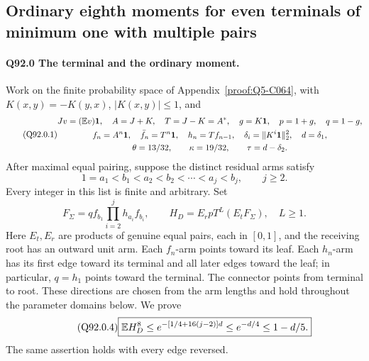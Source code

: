 \subsection{Ordinary eighth moments for even terminals of minimum one with multiple pairs}\label{proof:Q5-C092}

\paragraph{Q92.0 The terminal and the ordinary moment.}
Work on the finite probability space of Appendix~\ref{proof:Q5-C064}, with
\(K(x,\allowbreak y)=\allowbreak -K(y,\allowbreak x)\), \(|K(x,\allowbreak y)|\le\allowbreak 1\), and
\begin{equation}\tag{Q92.0.1}\label{eq:Q92:0.1}
\begin{gathered}
Jv=(\mathbb E v)\mathbf1,\quad A=J+K,\quad T=J-K=A^*,\quad
g=K\mathbf1,\quad p=1+g,\quad q=1-g,\\
f_n=A^n\mathbf1,\quad\bar f_n=T^n\mathbf1,\quad h_n=Tf_{n-1},\quad
\delta_i=\|K^i\mathbf1\|_2^2,\quad d=\delta_1,\\
\theta=13/32,\qquad\kappa=19/32,\qquad\tau=d-\delta_2.
\end{gathered}
\end{equation}
After maximal equal pairing, suppose the distinct residual arms satisfy
\begin{equation}\tag{Q92.0.2}\label{eq:Q92:0.2}
1=a_1<b_1<a_2<b_2<\cdots<a_j<b_j,\qquad j\ge2.
\end{equation}
Every integer in this list is finite and arbitrary. Set
\begin{equation}\tag{Q92.0.3}\label{eq:Q92:0.3}
F_\Sigma=qf_{b_1}\prod_{i=2}^jh_{a_i}f_{b_i},\qquad
H_D=E_rpT^L(E_tF_\Sigma),\quad L\ge1.
\end{equation}
Here \(E_t,\allowbreak E_r\) are products of genuine equal pairs, each in \([0,\allowbreak 1]\),
and the receiving root has an outward unit arm. Each \(f_n\)-arm points
toward its leaf. Each \(h_n\)-arm has its first edge toward its terminal
and all later edges toward the leaf; in particular, \(q=\allowbreak h_1\) points
toward the terminal. The connector points from terminal to root.
These directions are chosen from the arm lengths and hold throughout
the parameter domains below. We prove
\begin{equation}\tag{Q92.0.4}\label{eq:Q92:0.4}
\boxed{\mathbb E H_D^8\le
e^{-[1/4+16(j-2)]d}\le e^{-d/4}\le1-d/5.}
\end{equation}
The same assertion holds with every edge reversed.

